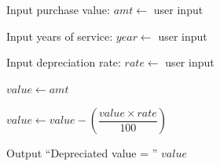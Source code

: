 \begin{algorithm}
\caption{Calculate Depreciated Value of an Asset}
\begin{algorithmic}[1]

\STATE Input purchase value:
\STATE $amt \gets$ user input

\STATE Input years of service:
\STATE $year \gets$ user input

\STATE Input depreciation rate:
\STATE $rate \gets$ user input

\STATE $value \gets amt$

    \STATE $value \gets value - \left(\dfrac{value \times rate}{100}\right)$
\ENDFOR

\STATE Output ``Depreciated value = '' $value$

\end{algorithmic}
\end{algorithm}
